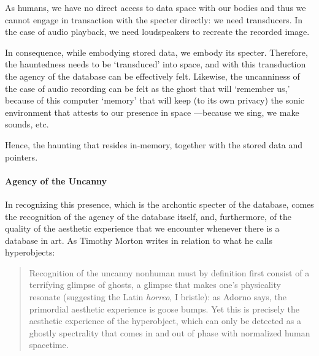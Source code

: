 As humans, we have no direct access to data space with our bodies and thus we cannot engage in transaction with the specter directly: we need transducers. In the case of audio playback, 
%
%
we need loudspeakers to recreate the recorded image. 

In consequence, while embodying stored data, we embody its specter.  %
Therefore, the hauntedness needs to be `transduced' into space, and with this transduction the agency of the database can be effectively felt. 
Likewise, the uncanniness of the case of audio recording can be felt as the ghost that will `remember us,' because of this computer `memory' that will keep (to its own privacy) the sonic environment that attests to our presence in space ---because we sing, we make sounds, etc. 

Hence, the haunting that resides in-memory, together with the stored data and pointers.



\paragraph{Agency of the Uncanny}

In recognizing this presence, which is the archontic specter of the database, comes the recognition of the agency of the database itself, and, furthermore, of the quality of the aesthetic experience that we encounter whenever there is a database in art. As Timothy Morton \parencite{Mor13:Hyp} writes in relation to what he calls hyperobjects:

\begin{quote}
	Recognition of the uncanny nonhuman must by definition first consist of a terrifying glimpse of ghosts, a glimpse that makes one's physicality resonate (suggesting the Latin \textit{horreo}, I bristle): as Adorno says, the primordial aesthetic experience is goose bumps. Yet this is precisely the aesthetic experience of the hyperobject, which can only be detected as a ghostly spectrality that comes in and out of phase with normalized human spacetime. \parencite[169]{Mor13:Hyp}
\end{quote}

